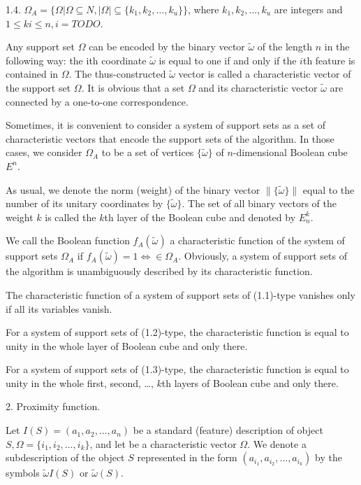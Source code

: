 1.4. $\Omega_A=\{\Omega|\Omega\subseteq N,|\Omega|\subseteq \{k_1,k_2,\ldots,k_u\}\}$, where 
$k_1,k_2,\ldots,k_u$  are integers and $1\leq ki \leq n, i=TODO$. 

Any support set $\Omega$ 
can be encoded by the binary vector $\tilde{\omega}$ of the length $n$ in the following way: 
the ith coordinate $\tilde{\omega}$ is equal to one if and only if the $i$th feature is contained 
in $\Omega$. The thus-constructed $\tilde{\omega}$ vector is called a characteristic vector 
of the support set $\Omega$. It is obvious that a set $\Omega$ and its characteristic 
vector $\tilde{\omega}$ are connected by a one-to-one correspondence.

Sometimes, it is convenient to consider a system of support sets as a set of characteristic 
vectors that encode the support sets of the algorithm. In those cases, we consider $\Omega_A$ 
to be a set of vertices $\{\tilde{\omega}\}$ of $n$-dimensional Boolean cube $E^n$. 

As usual, we denote the norm (weight) of the binary vector $\|\{\tilde{\omega}\}\|$ equal to 
the number of its unitary coordinates by $\{\tilde{\omega}\}$. The set of all binary vectors 
of the weight $k$ is called the $k$th layer of the Boolean cube and denoted by $E_n^k$.

We call the Boolean function $f_A(\tilde{\omega})$ a characteristic function of the system of support 
sets $\Omega_A$ if $f_A(\tilde{\omega})=1\Leftrightarrow \in \Omega_A$. Obviously, a system of support 
sets of the algorithm is unambiguously described by its characteristic function. 

The characteristic function of a system of support sets of (1.1)-type vanishes only if all its 
variables vanish.

For a system of support sets of (1.2)-type, the characteristic function is 
equal to unity in the whole layer of Boolean cube and only there.

For a system of support sets of (1.3)-type, the characteristic function is equal to 
unity in the whole first, second, \ldots, $k$th layers of Boolean cube and only there.   

2. Proximity function.

Let $I(S) = (a_1, a_2, \ldots, a_n)$ be a standard (feature) description of 
object $S, \Omega = \{i_1, i_2,\ldots, i_k\}$, and let  be a characteristic 
vector $\Omega$. We denote a subdescription of the object $S$ represented in 
the form $(a_{i_1}, a_{i_2} ,\ldots,a_{i_k})$ by the symbols 
$\tilde{\omega} I(S)$ or $\tilde{\omega}(S)$.

